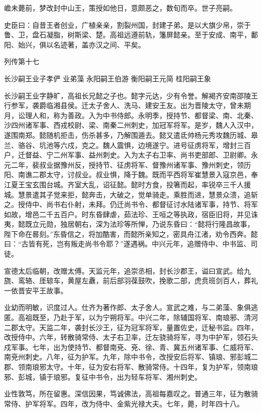 \documentclass[12pt,UTF8]{ctexbook}
\begin{document}
嶦未薨前，梦改封中山王，策授如他日，意颇恶之，数旬而卒。世子亮嗣。

史臣曰：自昔王者创业，广植亲亲，割裂州国，封建子弟。是以大旗少帛，崇于鲁、卫，盘石凝脂，树斯梁、楚。高祖远遵前轨，籓屏懿亲。至于安成、南平，鄱阳、始兴，俱以名迹著，盖亦汉之间、平矣。





列传第十七

长沙嗣王业子孝俨 业弟藻 永阳嗣王伯游 衡阳嗣王元简 桂阳嗣王象

长沙嗣王业字静旷，高祖长兄懿之子也。懿字元达，少有令誉。解褐齐安南邵陵王行参军，袭爵临湘县侯。迁太子舍人、洗马、建安王友。出为晋陵太守，曾未期月，讼理人和，称为善政。入为中书侍郎。永明季，授持节、都督梁、南、北秦、沙四州诸军事、西戎校尉、梁、南秦二州刺史，加冠军将军。是岁，魏人入汉中，遂围南郑。懿随机拒击，伤杀甚多，乃解围遁去。懿又遣氐帅杨元秀攻魏历城、皋兰、骆谷、坑池等六戍，克之。魏人震惧，边境遂宁。进号征虏将军，增封三百户，迁督益、宁二州军事、益州刺史。入为太子右卫率、尚书吏部郎、卫尉卿。永元二年，裴叔业据豫州反，授持节、征虏将军、督豫州诸军事、豫州刺史，领历阳、南谯二郡太守，讨叔业。叔业惧，降于魏。既而平西将军崔慧景入寇京邑，奉江夏王宝玄围台城。齐室大乱，诏征懿。懿时方食，投箸而起，率锐卒三千人援城。慧景遣其子觉来拒，懿奔击，大破之，觉单骑走。乘胜而进，慧景众溃，追斩之。授侍中、尚书右仆射，未拜。仍迁尚书令、都督征讨水陆诸军事，持节、将军如故，增邑二千五百户。时东昏肆虐，茹法珍、王咺之等执政，宿臣旧将，并见诛夷，懿既立元勋，独居朝右，深为法珍等所惮，乃说东昏曰：“懿将行隆昌故事，陛下命在晷刻。”东昏信之，将加酷害，而懿所亲知之，密具舟江渚，劝令西奔。懿曰：“古皆有死，岂有叛走尚书令耶？”遂遇祸。中兴元年，追赠侍中、中书监、司徒。

宣德太后临朝，改赠太傅。天监元年，追崇丞相，封长沙郡王，谥曰宣武。给九旒、鸾辂、厓辌车，黄屋左纛，前后部羽葆鼓吹，挽歌二部，虎贲班剑百人，葬礼一依晋安平王故事。

业幼而明敏，识度过人。仕齐为著作郎、太子舍人。宣武之难，与二弟藻、象俱逃匿。高祖既至，乃赴于军，以为宁朔将军。中兴二年，除辅国将军、南琅邪、清河二郡太守。天监二年，袭封长沙王，征为冠军将军，量置佐史，迁秘书监。四年，改授侍中。六年，转散骑常侍、太子右卫率，迁左骁骑将军，寻为中护军，领石头戍军事。七年，出为使持节、都督南兗、兗、徐、青、冀五州诸军事、仁威将军、南兗州刺史。八年，征为护军。九年，除中书令，改授安后将军、镇琅、邪彭城二郡、领南琅邪太守。十年，征为安右将军、散骑常侍。十四年，复为护军，领南琅邪、彭城，镇于琅邪。复征中书令，出为轻车将军、湘州刺史。

业性敦笃，所在留惠。深信因果，笃诚佛法，高祖每嘉叹之。普通三年，征为散骑常侍、护军将军。四年，改为侍中、金紫光禄大夫。七年，薨，时年四十八。
\end{document}
